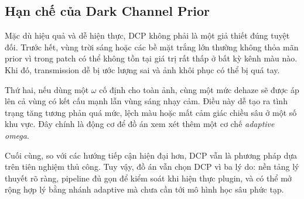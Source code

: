\subsection{Hạn chế của Dark Channel Prior}

Mặc dù hiệu quả và dễ hiện thực, DCP không phải là một giả thiết đúng tuyệt đối. Trước hết, vùng trời sáng hoặc các bề mặt trắng lớn thường không thỏa mãn prior vì trong patch có thể không tồn tại giá trị rất thấp ở bất kỳ kênh màu nào. Khi đó, transmission dễ bị ước lượng sai và ảnh khôi phục có thể bị quá tay.

Thứ hai, nếu dùng một \(\omega\) cố định cho toàn ảnh, cùng một mức dehaze sẽ được áp lên cả vùng có kết cấu mạnh lẫn vùng sáng nhạy cảm. Điều này dễ tạo ra tình trạng tăng tương phản quá mức, lệch màu hoặc mất cảm giác chiều sâu ở một số khu vực. Đây chính là động cơ để đồ án xem xét thêm một cơ chế \textit{adaptive omega}.

Cuối cùng, so với các hướng tiếp cận hiện đại hơn, DCP vẫn là phương pháp dựa trên tiên nghiệm thủ công. Tuy vậy, đồ án vẫn chọn DCP vì ba lý do: nền tảng lý thuyết rõ ràng, pipeline đủ gọn để kiểm soát khi hiện thực plugin, và có thể mở rộng hợp lý bằng nhánh adaptive mà chưa cần tới mô hình học sâu phức tạp.

